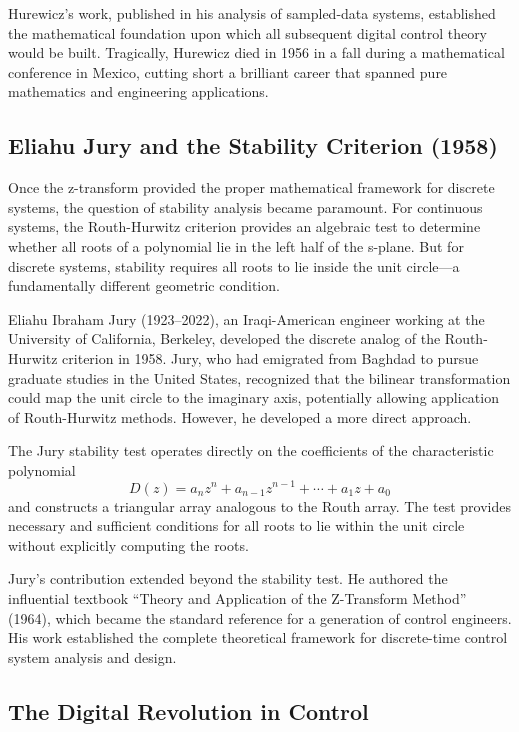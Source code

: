 Hurewicz's work, published in his analysis of sampled-data systems, established the mathematical foundation upon which all subsequent digital control theory would be built. Tragically, Hurewicz died in 1956 in a fall during a mathematical conference in Mexico, cutting short a brilliant career that spanned pure mathematics and engineering applications.

\subsection{Eliahu Jury and the Stability Criterion (1958)}

Once the z-transform provided the proper mathematical framework for discrete systems, the question of stability analysis became paramount. For continuous systems, the Routh-Hurwitz criterion provides an algebraic test to determine whether all roots of a polynomial lie in the left half of the s-plane. But for discrete systems, stability requires all roots to lie inside the unit circle---a fundamentally different geometric condition.

Eliahu Ibraham Jury (1923--2022), an Iraqi-American engineer working at the University of California, Berkeley, developed the discrete analog of the Routh-Hurwitz criterion in 1958. Jury, who had emigrated from Baghdad to pursue graduate studies in the United States, recognized that the bilinear transformation could map the unit circle to the imaginary axis, potentially allowing application of Routh-Hurwitz methods. However, he developed a more direct approach.

The Jury stability test operates directly on the coefficients of the characteristic polynomial
\begin{equation}
D(z) = a_n z^n + a_{n-1} z^{n-1} + \cdots + a_1 z + a_0
\end{equation}
and constructs a triangular array analogous to the Routh array. The test provides necessary and sufficient conditions for all roots to lie within the unit circle without explicitly computing the roots.

Jury's contribution extended beyond the stability test. He authored the influential textbook ``Theory and Application of the Z-Transform Method'' (1964), which became the standard reference for a generation of control engineers. His work established the complete theoretical framework for discrete-time control system analysis and design.

\subsection{The Digital Revolution in Control}

